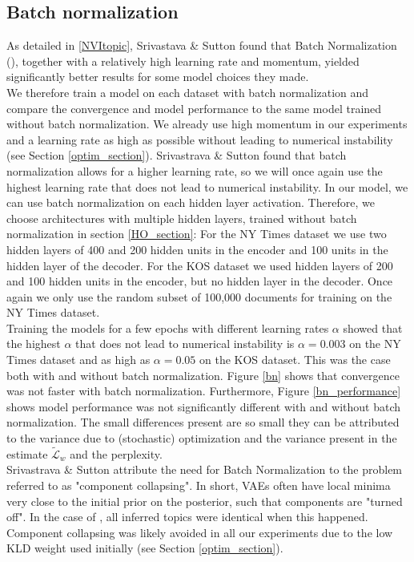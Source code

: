 \documentclass{report}
\begin{document}
	\subsection{Batch normalization}\label{batch_norm}
	As detailed in \ref{NVItopic}, Srivastava \& Sutton \cite{srivastava2017neural} found that Batch Normalization (\cite{srivastava2017neural}), together with a relatively high learning rate and momentum, yielded significantly better results for some model choices they made. \\
	We therefore train a model on each dataset with batch normalization and compare the convergence and model performance to the same model trained without batch normalization. We already use high momentum in our experiments and a learning rate as high as possible without leading to numerical instability (see Section \ref{optim_section}). Srivastrava \& Sutton \cite{srivastava2017neural} found that batch normalization allows for a higher learning rate, so we will once again use the highest learning rate that does not lead to numerical instability.	In our model, we can use batch normalization on each hidden layer activation. Therefore, we choose architectures with multiple hidden layers, trained without batch normalization in section \ref{HO_section}: For the NY Times dataset we use two hidden layers of  400 and 200 hidden units in the encoder and 100 units in the hidden layer of the decoder. For the KOS dataset we used hidden layers of 200 and 100 hidden units in the encoder, but no hidden layer in the decoder.
	Once again we only use the random subset of 100,000 documents for training on the NY Times dataset. \\
	Training the models for a few epochs with different learning rates $\alpha$ showed that the highest $\alpha$ that does not lead to numerical instability is $\alpha = 0.003$ on the NY Times dataset and as high as $\alpha = 0.05$ on the KOS dataset. This was the case both with and without batch normalization. Figure \ref{bn} shows that convergence was not faster with batch normalization. Furthermore, Figure \ref{bn_performance} shows model performance was not significantly different with and without batch normalization. The small differences present are so small they can be attributed to the variance due to (stochastic) optimization and the variance present in the estimate $\tilde{\mathcal{L}}_w$ and the perplexity. \\
	Srivastrava \& Sutton \cite{srivastava2017neural} attribute the need for Batch Normalization to the problem referred to as "component collapsing". In short, VAEs often have local minima very close to the initial prior on the posterior, such that components are "turned off". In the case of \cite{srivastava2017neural}, all inferred topics were identical when this happened. Component collapsing was likely avoided in all our experiments due to the low KLD weight used initially (see Section \ref{optim_section}).
	
\end{document}
